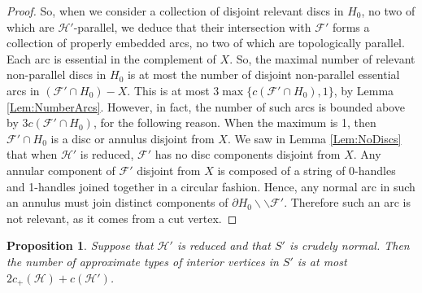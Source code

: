 \documentclass[oneside]{amsart}
\numberwithin{equation}{section}
\theoremstyle{plain}
\newtheorem{proposition}[equation]{Proposition}
\theoremstyle{definition}
\newcommand{\cut}{\backslash\backslash}
\newcommand{\calH}{\mathcal{H}}
\newcommand{\calF}{\mathcal{F}}
\begin{document}
\begin{proof}
So, when we consider a collection of disjoint relevant discs in $H_0$, no two of
which are $\mathcal{H}'$-parallel, we deduce that their intersection with
$\mathcal{F}'$ forms a collection of properly embedded arcs, no
two of which are topologically parallel. Each arc is essential in the
complement of $X$.
So, the maximal number of relevant non-parallel discs in $H_0$ is at most the number of disjoint non-parallel
essential arcs in $(\mathcal{F}' \cap H_0) - X$. This is at most $3 \max \{ c(\mathcal{F}' \cap H_0), 1\}$, by Lemma \ref{Lem:NumberArcs}.
However, in fact, the number of such arcs is bounded above by $3 c(\mathcal{F}' \cap H_0)$, for the following reason.
When the maximum is 1, then $\calF' \cap H_0$ is a disc or annulus disjoint from $X$.
We saw in Lemma \ref{Lem:NoDiscs} that when $\calH'$ is reduced, $\calF'$ has no disc components
disjoint from $X$. Any annular component of $\calF'$ disjoint from $X$ is composed
of a string of 0-handles and 1-handles joined together in a circular fashion. Hence,
any normal arc in such an annulus must join distinct components of $\partial H_0 \cut \calF'$.
Therefore such an arc is not relevant, as it comes from a cut vertex.
\end{proof}

\begin{proposition}
\label{Prop:NumberWeakTileTypes}
Suppose that $\mathcal{H}'$ is reduced and that
$S'$ is crudely normal.
Then the number of approximate types of interior vertices in $S'$ is at most 
$2c_+(\mathcal{H}) + c(\mathcal{H}')$.
\end{proposition}
\end{document}
